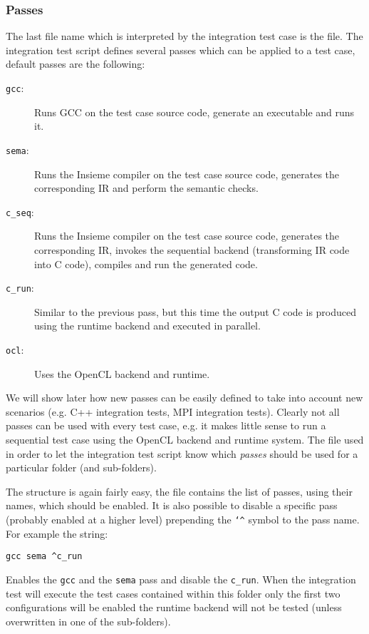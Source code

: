 \subsubsection{Passes}
The last file name which is interpreted by the integration test case is the
 file. The integration test script defines several passes which can
be applied to a test case, default passes are the following:

\begin{description}

	\item[\texttt{gcc}:] Runs GCC on the test case source code, generate an executable and
		runs it.

	\item[\texttt{sema}:] Runs the Insieme compiler on the test case source code,
		generates the corresponding IR and perform the semantic checks.

	\item[\texttt{c\_seq}:] Runs the Insieme compiler on the test case source code,
		generates the corresponding IR, invokes the sequential backend
		(transforming IR code into C code), compiles and run the generated code.

	\item[\texttt{c\_run}:] Similar to the previous pass, but this time the output C
		code is produced using the runtime backend and executed in parallel. 

	\item[\texttt{ocl}:] Uses the OpenCL backend and runtime. 

\end{description}

We will show later how new passes can be easily defined to take into account new
scenarios (e.g. C++ integration tests, MPI integration tests). Clearly not all
passes can be used with every test case, e.g. it makes little sense to run a
sequential test case using the OpenCL backend and runtime system. The
 file used in order to let the integration test script know which
{\em passes} should be used for a particular folder (and sub-folders).

The structure is again fairly easy, the file contains the list of passes, using their
names, which should be enabled. It is also possible to disable a specific pass
(probably enabled at a higher level) prepending the {\tt \char`\^} symbol to the pass
name. For example the string:
\begin{verbatim} 
gcc sema ^c_run
\end{verbatim} 
Enables the {\tt gcc} and the {\tt sema} pass and disable the {\tt c\_run}. When
the integration test will execute the test cases contained within this folder
only the first two configurations will be enabled the runtime backend will not
be tested (unless overwritten in one of the sub-folders).

